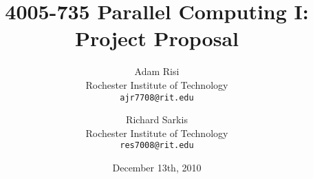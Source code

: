 \documentclass[12pt]{report}
\title{4005-735 Parallel Computing I: Project Proposal}
\author{Adam Risi \\ Rochester Institute of Technology \\ \texttt{ajr7708@rit.edu} \and Richard Sarkis \\ Rochester Institute of Technology \\  \texttt{res7008@rit.edu}}
\date{December 13th, 2010}
\begin{document}
\maketitle







\nocite{*}


\end{document}
